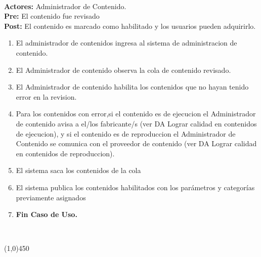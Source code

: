 \documentclass[11pt, a4paper, spanish]{article}
\begin{document}
{	 \\
\textbf{Actores:} Administrador de Contenido. \\
\textbf{Pre:} El contenido fue revisado \\
\textbf{Post:}  El contenido es marcado como habilitado y los usuarios pueden adquirirlo.\\
\begin{enumerate}
	\item El administrador de contenidos ingresa al sistema de administracion de contenido.
\item El Administrador de contenido observa la cola de contenido revisado. 
\item El Administrador de contenido habilita los contenidos que no hayan tenido error en la revision.
\item Para los contenidos con error,si el contenido es de ejecucion el Administrador de contenido avisa a el/los fabricante/s (ver DA Lograr calidad en contenidos de ejecucion), y si el contenido es de reproduccion el Administrador de Contenido se comunica con el proveedor de contenido (ver DA Lograr calidad en contenidos de reproduccion). 
\item El sistema saca los contenidos de la cola
\item El sistema publica los contenidos habilitados con los parámetros y categorías previamente asignados
\item \textbf{Fin Caso de Uso.} \\

\end{enumerate}
 \\
\begin{center} \line(1,0){450} \end{center}



}
\end{document}

